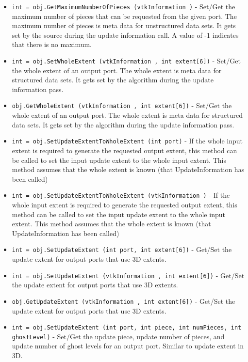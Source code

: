 \begin{itemize}
\item  \verb|int = obj.GetMaximumNumberOfPieces (vtkInformation )| -  Set/Get the maximum number of pieces that can be requested from
 the given port.  The maximum number of pieces is meta data for
 unstructured data sets.  It gets set by the source during the
 update information call.  A value of -1 indicates that there is
 no maximum.

\item  \verb|int = obj.SetWholeExtent (vtkInformation , int extent[6])| -  Set/Get the whole extent of an output port.  The whole extent is
 meta data for structured data sets.  It gets set by the algorithm
 during the update information pass.

\item  \verb|obj.GetWholeExtent (vtkInformation , int extent[6])| -  Set/Get the whole extent of an output port.  The whole extent is
 meta data for structured data sets.  It gets set by the algorithm
 during the update information pass.

\item  \verb|int = obj.SetUpdateExtentToWholeExtent (int port)| -  If the whole input extent is required to generate the requested output
 extent, this method can be called to set the input update extent to the
 whole input extent. This method assumes that the whole extent is known
 (that UpdateInformation has been called)

\item  \verb|int = obj.SetUpdateExtentToWholeExtent (vtkInformation )| -  If the whole input extent is required to generate the requested output
 extent, this method can be called to set the input update extent to the
 whole input extent. This method assumes that the whole extent is known
 (that UpdateInformation has been called)

\item  \verb|int = obj.SetUpdateExtent (int port, int extent[6])| -  Get/Set the update extent for output ports that use 3D extents.

\item  \verb|int = obj.SetUpdateExtent (vtkInformation , int extent[6])| -  Get/Set the update extent for output ports that use 3D extents.

\item  \verb|obj.GetUpdateExtent (vtkInformation , int extent[6])| -  Get/Set the update extent for output ports that use 3D extents.

\item  \verb|int = obj.SetUpdateExtent (int port, int piece, int numPieces, int ghostLevel)| -  Set/Get the update piece, update number of pieces, and update
 number of ghost levels for an output port.  Similar to update
 extent in 3D.


\end{itemize}
